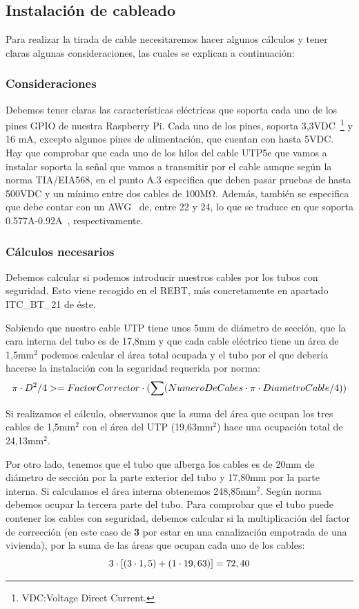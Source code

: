 \subsection{Instalación de cableado}
Para realizar la tirada de cable necesitaremos hacer algunos cálculos y tener claras algunas consideraciones, las cuales se explican a continuación:

\subsubsection{Consideraciones}
Debemos tener claras las características eléctricas que soporta cada uno de los pines GPIO de nuestra Raspberry Pi. Cada uno de los pines, soporta 3,3VDC~\footnote{VDC:Voltage Direct Current.} y 16 mA, excepto algunos pines de alimentación, que cuentan con hasta 5VDC.
Hay que comprobar que cada uno de los hilos del cable UTP5e que vamos a instalar soporta la señal que vamos a transmitir por el cable aunque según la norma TIA/EIA568, en el punto A.3 especifica que deben pasar pruebas de hasta 500VDC y un mínimo entre dos cables de 100M\si{\ohm}. Además, también se especifica que debe contar con un AWG~\cite{wiki:DefAWG} de, entre 22 y 24, lo que se traduce en que soporta 0.577A-0.92A~\cite{wiki:TablaAWG}, respectivamente.

\subsubsection{Cálculos necesarios}
Debemos calcular si podemos introducir nuestros cables por los tubos con seguridad. Esto viene recogido en el REBT, más concretamente en apartado ITC\_BT\_21 de éste.

Sabiendo que nuestro cable UTP tiene unos 5mm de diámetro de sección, que la cara interna del tubo es de 17,8mm y que cada cable eléctrico tiene un área de 1,5mm$^{2}$ podemos calcular el área total ocupada y el tubo por el que debería hacerse la instalación con la seguridad requerida por norma:
\begin{equation}
\centering
\pi \cdot D^2/4 >= FactorCorrector \cdot (\sum(NumeroDeCabes \cdot \pi \cdot DiametroCable/4))
\end{equation}\label{E1}

Si realizamos el cálculo, observamos que la suma del área que ocupan los tres cables de 1,5mm$^{2}$ con el área del UTP (19,63mm$^{2}$) hace una ocupación total de 24,13mm$^{2}$.

Por otro lado, tenemos que el tubo que alberga los cables es de 20mm de diámetro de sección por la parte exterior del tubo y 17,80mm por la parte interna. Si calculamos el área interna obtenemos 248,85mm$^{2}$.
Según norma debemos ocupar la tercera parte del tubo. Para comprobar que el tubo puede contener los cables con seguridad, debemos calcular si la multiplicación del factor de corrección (en este caso de \textbf{3} por estar en una canalización empotrada de una vivienda), por la suma de las áreas que ocupan cada uno de los cables: 
\begin{equation}
\centering
3 \cdot [(3 \cdot 1,5)+(1 \cdot 19,63)]=72,40
\end{equation}\label{E2}

